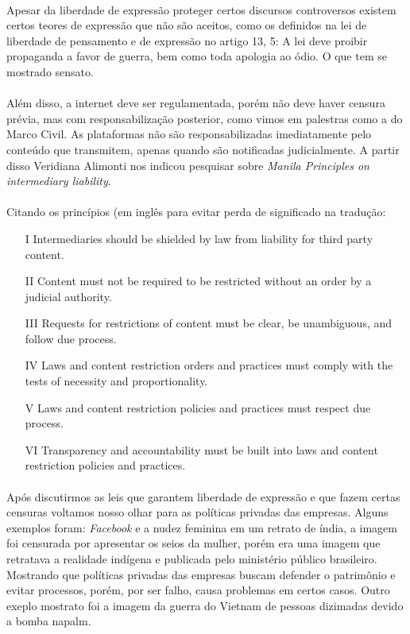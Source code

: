 \documentclass[12pt]{article}
\begin{document}
	\paragraph{}
		Apesar da liberdade de expressão proteger certos discursos controversos
		existem certos teores de expressão que não são aceitos, como os definidos
		na lei de liberdade de pensamento e de expressão no artigo 13, 5: A lei deve 
		proibir propaganda a favor de guerra, bem como toda apologia ao ódio. O que
		tem se mostrado sensato.
	\paragraph{}
		Além disso, a internet deve ser regulamentada, porém não deve haver censura 
		prévia, mas com responsabilização posterior, como vimos em palestras como
		a do Marco Civil. As plataformas não são responsabilizadas imediatamente
		pelo conteúdo que transmitem, apenas quando são notificadas judicialmente.
		A partir disso Veridiana Alimonti nos indicou pesquisar sobre \textit{Manila 
		Principles on intermediary liability}.
	\paragraph{}
		Citando os princípios (em inglês para evitar perda de significado na tradução:
		\begin{itemize}
			\item[I]
				Intermediaries should be shielded by law from liability for third party 
				content.
			\item[II]
				Content must not be required to be restricted without an order by a 
				judicial authority.
			\item[III]
				Requests for restrictions of content must be clear, be unambiguous, and 
				follow due process.
			\item[IV]
				Laws and content restriction orders and practices must comply with the 
				tests of necessity and proportionality.
			\item[V]
				Laws and content restriction policies and practices must respect due 
				process.
			\item[VI]
				Transparency and accountability must be built into laws and content 
				restriction policies and practices.					
		\end{itemize}			
	\paragraph{}
		Após discutirmos as leis que garantem liberdade de expressão e que fazem
		certas censuras voltamos nosso olhar para as políticas privadas das empresas.
		Alguns exemplos foram:
		\textit{Facebook} e a nudez feminina em um retrato de índia, a imagem
		foi censurada por apresentar os seios da mulher, porém era uma
		imagem que retratava a realidade indígena e publicada pelo ministério público
		brasileiro. Mostrando que políticas privadas das empresas buscam defender
		o patrimônio e evitar processos, porém, por ser falho, causa problemas em
		certos casos. Outro exeplo mostrato foi a imagem da guerra do Vietnam de  
		pessoas dizimadas devido a bomba napalm.
\end{document}
